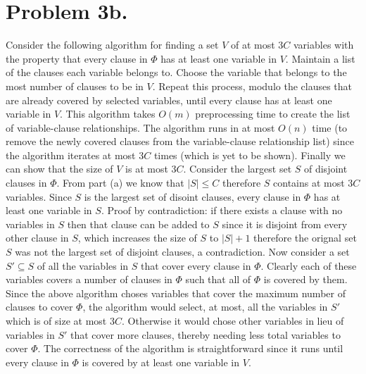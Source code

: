 \documentclass[12pt]{article}
\begin{document}
\section*{Problem 3b.}
Consider the following algorithm for finding a set $V$ of at most $3C$ variables
with the property that every clause in $\Phi$ has at least one variable in $V$.
Maintain a list of the clauses each variable belongs to. Choose the variable that
belongs to the most number of clauses to be in $V$. Repeat this process, modulo
the clauses that are already covered by selected variables, until every clause
has at least one variable in $V$. This algorithm takes $O(m)$ preprocessing time
to create the list of variable-clause relationships. The algorithm runs in at
most $O(n)$ time (to remove the newly covered clauses from the variable-clause
relationship list) since the algorithm iterates at most $3C$ times (which is yet
to be shown). Finally we can show that the size of $V$ is at most $3C$. Consider
the largest set $S$ of disjoint clauses in $\Phi$. From part (a) we know that
$|S| \le C$ therefore $S$ contains at most $3C$ variables. Since $S$ is the
largest set of disoint clauses, every clause in $\Phi$ has at least one variable
in $S$. Proof by contradiction: if there exists a clause with no variables in
$S$ then that clause can be added to $S$ since it is disjoint from every other
clause in $S$, which increases the size of $S$ to $|S|+1$ therefore the orignal
set $S$ was not the largest set of disjoint clauses, a contradiction. Now
consider a set $S' \subseteq S$ of all the variables in $S$ that cover every
clause in $\Phi$. Clearly each of these variables covers a number of clauses in
$\Phi$ such that all of $\Phi$ is covered by them. Since the above algorithm
choses variables that cover the maximum number of clauses to cover $\Phi$, the
algorithm would select, at most, all the variables in $S'$ which is of size at
most $3C$. Otherwise it would chose other variables in lieu of variables in $S'$
that cover more clauses, thereby needing less total variables to cover $\Phi$.
The correctness of the algorithm is straightforward since it runs until every
clause in $\Phi$ is covered by at least one variable in $V$.
\end{document}
